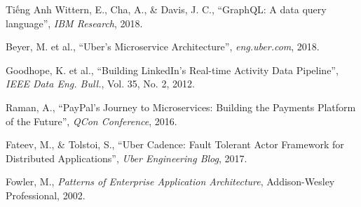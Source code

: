 \documentclass{uetgraduation}
\begin{document}
\begin{thebibliography}{9}
\begin{bibsection}{Tiếng Anh}
        Wittern, E., Cha, A., \& Davis, J. C.,
        ``GraphQL: A data query language'',
        \textit{IBM Research},
        2018.

        Beyer, M. et al.,
        ``Uber's Microservice Architecture'',
        \textit{eng.uber.com},
        2018.

        Goodhope, K. et al.,
        ``Building LinkedIn's Real-time Activity Data Pipeline'',
        \textit{IEEE Data Eng. Bull.},
        Vol. 35, No. 2, 2012.

        Raman, A.,
        ``PayPal's Journey to Microservices: Building the Payments Platform of the Future'',
        \textit{QCon Conference},
        2016.

        Fateev, M., \& Tolstoi, S.,
        ``Uber Cadence: Fault Tolerant Actor Framework for Distributed Applications'',
        \textit{Uber Engineering Blog},
        2017.

        Fowler, M.,
        \textit{Patterns of Enterprise Application Architecture},
        Addison-Wesley Professional, 2002.
    \end{bibsection}
\end{thebibliography}
\end{document}
